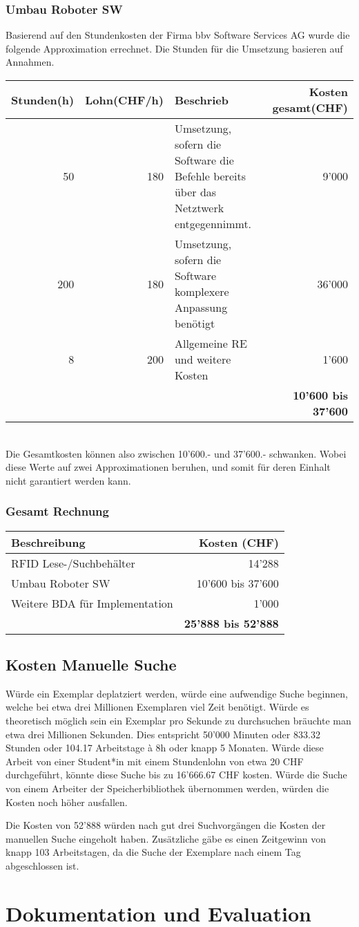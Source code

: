 \subsection{Umbau Roboter SW}
Basierend auf den Stundenkosten der Firma bbv Software Services AG wurde die folgende Approximation errechnet.
Die Stunden für die Umsetzung basieren auf Annahmen.

\begin{tabularx}{\textwidth}{|r|r|X|r|}
	\hline 
	\textbf{Stunden(h)} & \textbf{Lohn(CHF/h)} & \textbf{Beschrieb} & \textbf{Kosten gesamt(CHF)} \\
	\hline 
	50 & 180 & Umsetzung, sofern die Software die Befehle bereits über das Netztwerk entgegennimmt. & 9'000 \\
	\hline
	200 & 180 & Umsetzung, sofern die Software komplexere Anpassung benötigt & 36'000 \\
	\hline
	8 & 200 & Allgemeine RE und weitere Kosten & 1'600 \\
	\hline	
	& & & \textbf{10'600 bis 37'600} \\ 
	\hline
\end{tabularx}
\\
Die Gesamtkosten können also zwischen 10'600.- und 37'600.- schwanken. Wobei diese Werte auf zwei Approximationen beruhen, und somit für deren Einhalt nicht garantiert werden kann.

\subsection{Gesamt Rechnung}
\begin{tabularx}{\textwidth}{|X|r|}
	\hline
	\textbf{Beschreibung} & \textbf{Kosten (CHF)} \\
	\hline
	RFID Lese-/Suchbehälter & 14'288 \\
	\hline
	Umbau Roboter SW & 10'600 bis 37'600 \\
	\hline
	Weitere BDA für Implementation & 1'000 \\
	\hline
	& \textbf{25'888 bis 52'888} \\
	\hline
\end{tabularx}

\section{Kosten Manuelle Suche}
Würde ein Exemplar deplatziert werden, würde eine aufwendige Suche beginnen, welche bei etwa drei Millionen Exemplaren viel Zeit benötigt. Würde es theoretisch möglich sein ein Exemplar pro Sekunde zu durchsuchen bräuchte man etwa drei Millionen Sekunden. Dies entspricht 50'000 Minuten oder 833.32 Stunden oder 104.17 Arbeitstage à 8h oder knapp 5 Monaten. Würde diese Arbeit von einer Student*in mit einem Stundenlohn von etwa 20 CHF durchgeführt, könnte diese Suche bis zu 16'666.67 CHF kosten. Würde die Suche von einem Arbeiter der Speicherbibliothek übernommen werden, würden die Kosten noch höher ausfallen.

Die Kosten von 52'888 würden nach gut drei Suchvorgängen die Kosten der manuellen Suche eingeholt haben. Zusätzliche gäbe es einen Zeitgewinn von knapp 103 Arbeitstagen, da die Suche der Exemplare nach einem Tag abgeschlossen ist.


\chapter{Dokumentation und Evaluation}